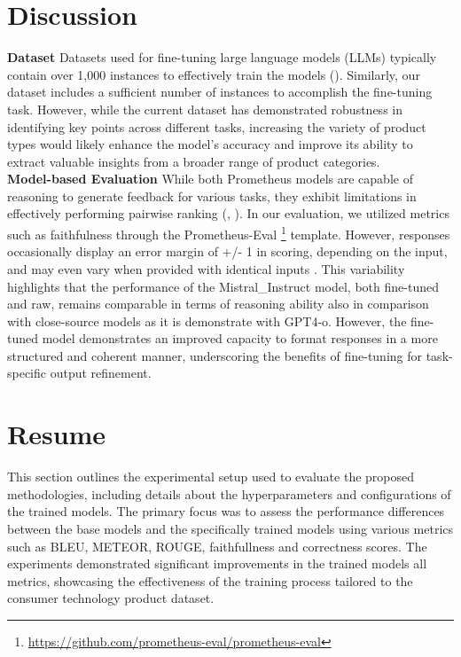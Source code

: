 \section{Discussion}
\textbf{Dataset} Datasets used for fine-tuning large language models (LLMs) typically contain over 1,000 instances to effectively train the models (\citep{liu2024datasetslargelanguagemodels}). Similarly, our dataset includes a sufficient number of instances to accomplish the fine-tuning task. However, while the current dataset has demonstrated robustness in identifying key points across different tasks, increasing the variety of product types would likely enhance the model's accuracy and improve its ability to extract valuable insights from a broader range of product categories.\\
\textbf{Model-based Evaluation} While both Prometheus models are capable of reasoning to generate feedback for various tasks, they exhibit limitations in effectively performing pairwise ranking (\citep{kim2024prometheusinducingfinegrainedevaluation}, \citep{kim2024prometheus2opensource}). In our evaluation, we utilized metrics such as faithfulness through the Prometheus-Eval \footnote{\url{https://github.com/prometheus-eval/prometheus-eval}} template. However, responses occasionally display an error margin of +/- 1 in scoring, depending on the input, and may even vary when provided with identical inputs \citep{kim2024biggenbenchprincipledbenchmark}.  This variability highlights that the performance of the Mistral\_Instruct model, both fine-tuned and raw, remains comparable in terms of reasoning ability also in comparison with close-source models as it is demonstrate with GPT4-o. However, the fine-tuned model demonstrates an improved capacity to format responses in a more structured and coherent manner, underscoring the benefits of fine-tuning for task-specific output refinement.

\section{Resume}
This section outlines the experimental setup used to evaluate the proposed methodologies, including details about the hyperparameters and configurations of the trained models. The primary focus was to assess the performance differences between the base models and the specifically trained models using various metrics such as BLEU, METEOR, ROUGE, faithfullness and correctness scores. The experiments demonstrated significant improvements in the trained models all metrics, showcasing the effectiveness of the training process tailored to the consumer technology product dataset.